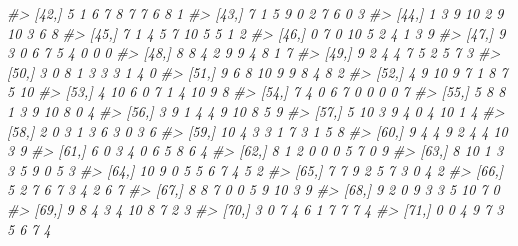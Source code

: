 \documentclass[
]{book}
\newenvironment{Shaded}{\begin{snugshade}}{\end{snugshade}}
\newcommand{\CommentTok}[1]{\textcolor[rgb]{0.56,0.35,0.01}{\textit{#1}}}
\begin{document}
\begin{Shaded}
\begin{Highlighting}[]
\CommentTok{\#\textgreater{}  [42,]    5    1    6    7    8    7    7    6    8     1}
\CommentTok{\#\textgreater{}  [43,]    7    1    5    9    0    2    7    6    0     3}
\CommentTok{\#\textgreater{}  [44,]    1    3    9   10    2    9   10    3    6     8}
\CommentTok{\#\textgreater{}  [45,]    7    1    4    5    7   10    5    5    1     2}
\CommentTok{\#\textgreater{}  [46,]    0    7    0   10    5    2    4    1    3     9}
\CommentTok{\#\textgreater{}  [47,]    9    3    0    6    7    5    4    0    0     0}
\CommentTok{\#\textgreater{}  [48,]    8    8    4    2    9    9    4    8    1     7}
\CommentTok{\#\textgreater{}  [49,]    9    2    4    4    7    5    2    5    7     3}
\CommentTok{\#\textgreater{}  [50,]    3    0    8    1    3    3    3    1    4     0}
\CommentTok{\#\textgreater{}  [51,]    9    6    8   10    9    9    8    4    8     2}
\CommentTok{\#\textgreater{}  [52,]    4    9   10    9    7    1    8    7    5    10}
\CommentTok{\#\textgreater{}  [53,]    4   10    6    0    7    1    4   10    9     8}
\CommentTok{\#\textgreater{}  [54,]    7    4    0    6    7    0    0    0    0     7}
\CommentTok{\#\textgreater{}  [55,]    5    8    8    1    3    9   10    8    0     4}
\CommentTok{\#\textgreater{}  [56,]    3    9    1    4    4    9   10    8    5     9}
\CommentTok{\#\textgreater{}  [57,]    5   10    3    9    4    0    4   10    1     4}
\CommentTok{\#\textgreater{}  [58,]    2    0    3    1    3    6    3    0    3     6}
\CommentTok{\#\textgreater{}  [59,]   10    4    3    3    1    7    3    1    5     8}
\CommentTok{\#\textgreater{}  [60,]    9    4    4    9    2    4    4   10    3     9}
\CommentTok{\#\textgreater{}  [61,]    6    0    3    4    0    6    5    8    6     4}
\CommentTok{\#\textgreater{}  [62,]    8    1    2    0    0    0    5    7    0     9}
\CommentTok{\#\textgreater{}  [63,]    8   10    1    3    3    5    9    0    5     3}
\CommentTok{\#\textgreater{}  [64,]   10    9    0    5    5    6    7    4    5     2}
\CommentTok{\#\textgreater{}  [65,]    7    7    9    2    5    7    3    0    4     2}
\CommentTok{\#\textgreater{}  [66,]    5    2    7    6    7    3    4    2    6     7}
\CommentTok{\#\textgreater{}  [67,]    8    8    7    0    0    5    9   10    3     9}
\CommentTok{\#\textgreater{}  [68,]    9    2    0    9    3    3    5   10    7     0}
\CommentTok{\#\textgreater{}  [69,]    9    8    4    3    4   10    8    7    2     3}
\CommentTok{\#\textgreater{}  [70,]    3    0    7    4    6    1    7    7    7     4}
\CommentTok{\#\textgreater{}  [71,]    0    0    4    9    7    3    5    6    7     4}

\end{Highlighting}
\end{Shaded}
\end{document}
